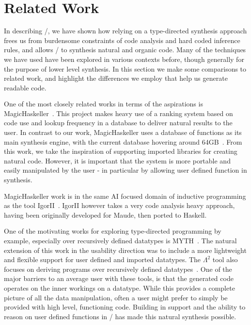 \section{Related Work}
\label{sec:related}

In describing \ourTool/, we have shown how relying on a type-directed synthesis approach frees us from burdensome constraints of code analysis and hard coded inference rules, and allows \ourTool/ to synthesis natural and organic code. Many of the techniques we have used have been explored in various contexts before, though generally for the purpose of lower level synthesis. In this section we make some comparisons to related work, and highlight the differences we employ that help us generate readable code.

One of the most closely related works in terms of the aspirations is MagicHaskeller~\cite{DBLP:conf/aaip/Katayama09}. This project makes heavy use of a ranking system based on code use and lookup frequency in a database to deliver natural results to the user. In contrast to our work, MagicHaskeller uses a database of functions as its main synthesis engine, with the current database hovering around 
64GB~\cite{DBLP:conf/agi/Katayama15}. From this work, we take the inspiration of supporting imported libraries for creating natural code. However, it is important that the system is more portable and easily manipulated by the user - in particular by allowing user defined function in synthesis.

MagicHaskeller work is in the same AI focused domain of inductive programming as the tool IgorII~\cite{DBLP:conf/aaip/HofmannKS09}. IgorII however takes a very code analysis heavy approach, having been originally developed for Maude, then ported to Haskell.

One of the motivating works for exploring type-directed programming by example, especially over recursively defined datatypes is MYTH~\cite{Osera:2015, Osera:2016}. The natural extension of this work in the usability direction was to include a more lightweight and flexible support for user defined and imported datatypes. The $\Lambda^2$ tool also focuses on deriving programs over recursively defined datatypes~\cite{Feser:2015}. One of the major barriers to an average user with these tools, is that the generated code operates on the inner workings on a datatype. While this provides a complete picture of all the data manipulation, often a user might prefer to simply be provided with high level, functioning code. Building in support and the ability to reason on user defined functions in \ourTool/ has made this natural synthesis possible.


